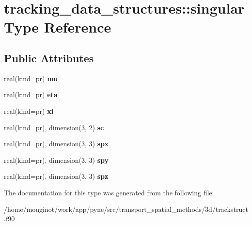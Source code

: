 \hypertarget{structtracking__data__structures_1_1singular}{}\section{tracking\+\_\+data\+\_\+structures\+:\+:singular Type Reference}
\label{structtracking__data__structures_1_1singular}
\subsection*{Public Attributes}
\begin{DoxyCompactItemize}
\item 
\mbox{\label{structtracking__data__structures_1_1singular_acd79fe7d9374778a1a073f01d33bc323}} 
real(kind=pr) {\bfseries mu}
\item 
\mbox{\label{structtracking__data__structures_1_1singular_a8015e49ee70edd759eb801446b40de59}} 
real(kind=pr) {\bfseries eta}
\item 
\mbox{\label{structtracking__data__structures_1_1singular_ac42e62b9f85705c6e68a6d07bc6c889c}} 
real(kind=pr) {\bfseries xi}
\item 
\mbox{\label{structtracking__data__structures_1_1singular_ae99e040b2944a8f103cb730cef072f7b}} 
real(kind=pr), dimension(3, 2) {\bfseries sc}
\item 
\mbox{\label{structtracking__data__structures_1_1singular_aeb81711c1d7153fe3dc8eae682f08134}} 
real(kind=pr), dimension(3, 3) {\bfseries spx}
\item 
\mbox{\label{structtracking__data__structures_1_1singular_ab7f1cf71b301b3dd7b30004bb3fecbea}} 
real(kind=pr), dimension(3, 3) {\bfseries spy}
\item 
\mbox{\label{structtracking__data__structures_1_1singular_a5bfe4d508ca8ba24ddd3c14c20c03086}} 
real(kind=pr), dimension(3, 3) {\bfseries spz}
\end{DoxyCompactItemize}


The documentation for this type was generated from the following file\+:\begin{DoxyCompactItemize}
\item 
/home/mouginot/work/app/pyne/src/transport\+\_\+spatial\+\_\+methods/3d/trackstruct.\+f90\end{DoxyCompactItemize}
